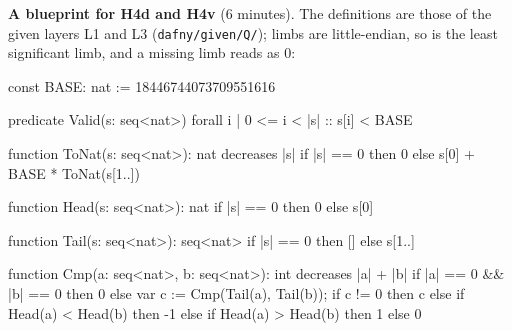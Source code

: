 \documentclass[11pt]{article}
\begin{document}
\begin{problem}\label{prob:B1}
\textbf{A blueprint for H4d and H4v} (6 minutes). The definitions are those of
the given layers L1 and L3 (\texttt{dafny/given/Q/}); limbs are little-endian,
so  is the least significant limb, and a missing limb reads as 0:
\begin{dafnycode}
const BASE: nat := 18446744073709551616

predicate Valid(s: seq<nat>)
{
  forall i | 0 <= i < |s| :: s[i] < BASE
}

function ToNat(s: seq<nat>): nat
  decreases |s|
{
  if |s| == 0 then 0 else s[0] + BASE * ToNat(s[1..])
}

function Head(s: seq<nat>): nat { if |s| == 0 then 0 else s[0] }

function Tail(s: seq<nat>): seq<nat> { if |s| == 0 then [] else s[1..] }

function Cmp(a: seq<nat>, b: seq<nat>): int
  decreases |a| + |b|
{
  if |a| == 0 && |b| == 0 then 0
  else
    var c := Cmp(Tail(a), Tail(b));
    if c != 0 then c
    else if Head(a) < Head(b) then -1
    else if Head(a) > Head(b) then 1
    else 0
}


\end{dafnycode}
\end{problem}
\end{document}
